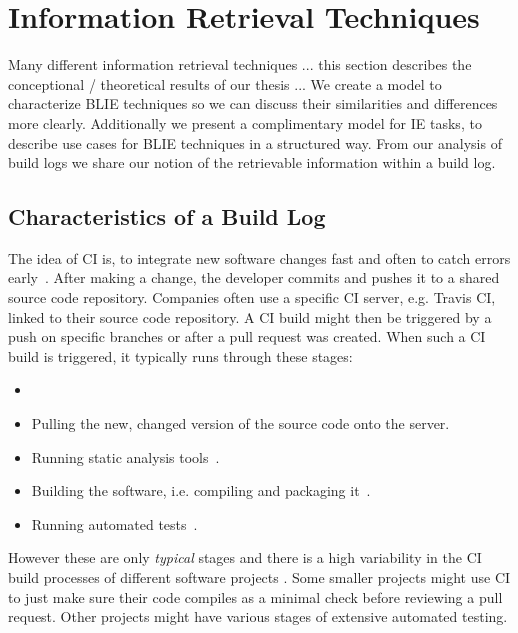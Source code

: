 \documentclass[\myrootdir/main.tex]{subfiles}
\begin{document}
\chapter{Information Retrieval Techniques}
\label{sec:models}
Many different information retrieval techniques ... this section describes the conceptional / theoretical results of our thesis ...
We create a model to characterize BLIE techniques so we can discuss their similarities and differences more clearly.
Additionally we present a complimentary model for IE tasks, to describe use cases for BLIE techniques in a structured way.
From our analysis of build logs we share our notion of the retrievable information within a build log.

\section{Characteristics of a Build Log}
The idea of CI is, to integrate new software changes fast and often to catch errors early~\cite{humble2010continuous}.
After making a change, the developer commits and pushes it to a shared source code repository. Companies often use a specific CI server, e.g. Travis CI, linked to their source code repository.
A CI build might then be triggered by a push on specific branches or after a pull request was created.
When such a CI build is triggered, it typically runs through these stages:

\begin{itemize}
	\item {}
	\item Pulling the new, changed version of the source code onto the server.
	\item Running static analysis tools~\cite{zampetti2017open}.
	\item Building the software, i.e. compiling and packaging it~\cite{phillips2014understanding}.
	\item Running automated tests~\cite{beller2017oops}.
\end{itemize}

However these are only \emph{typical} stages and there is a high variability in the CI build processes of different software projects .
Some smaller projects might use CI to just make sure their code compiles as a minimal check before reviewing a pull request.
Other projects might have various stages of extensive automated testing.
\end{document}
